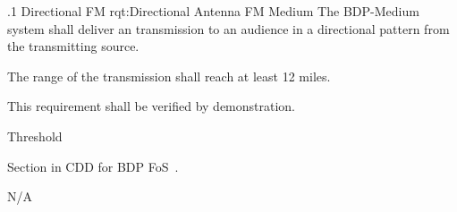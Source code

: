 
\NRQMTT
{\RqtNumberBase.1}
{Directional FM}
{rqt:Directional Antenna FM Medium}
{The BDP-Medium system shall deliver an \FM transmission to an audience in a directional pattern from the transmitting source.}%
{
	\item The range of the \FM transmission shall reach at least 12 miles.
}
{This requirement shall be verified by demonstration.}
{
	\item [Phase 1] Threshold
}
{
\item [5.1.2] Section in CDD for BDP FoS~\cite{ref__BDP_FOS_CDD}.	
} 
{
	\item N/A
}

